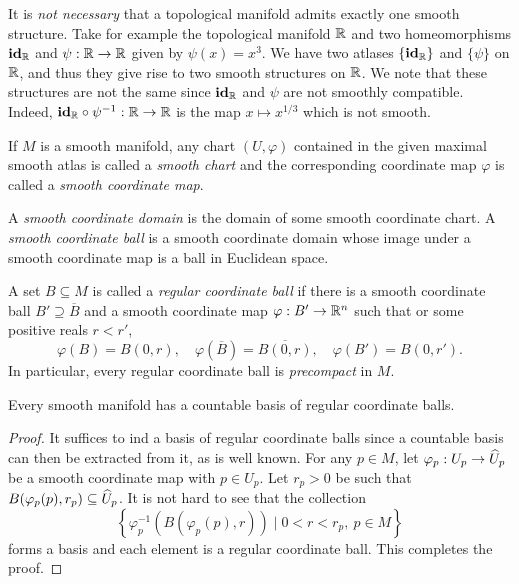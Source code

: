 \begin{remark}
    It is \emph{not necessary} that a topological manifold admits exactly one smooth structure. Take for example the topological manifold $\mathbb{R}$ and two homeomorphisms $\mathbf{id}_{\mathbb{R}}$ and $\psi:\mathbb{R}\to\mathbb{R}$ given by $\psi(x) = x^3$. We have two atlases $\{\mathbf{id}_{\mathbb{R}}\}$ and $\{\psi\}$ on $\mathbb{R}$, and thus they give rise to two smooth structures on $\mathbb{R}$. We note that these structures are not the same since $\mathbf{id}_{\mathbb{R}}$ and $\psi$ are not smoothly compatible. Indeed, $\mathbf{id}_{\mathbb{R}}\circ\psi^{-1}:\mathbb{R}\to\mathbb{R}$ is the map $x\mapsto x^{1/3}$ which is not smooth.
\end{remark}

\begin{definition}
    If $M$ is a smooth manifold, any chart $(U,\varphi)$ contained in the given maximal smooth atlas is called a \emph{smooth chart} and the corresponding coordinate map $\varphi$ is called a \emph{smooth coordinate map}. 
    
    A \emph{smooth coordinate domain} is the domain of some smooth coordinate chart. A \emph{smooth coordinate ball} is a smooth coordinate domain whose image under a smooth coordinate map is a ball in Euclidean space.

    A set $B\subseteq M$ is called a \emph{regular coordinate ball} if there is a smooth coordinate ball $B'\supseteq\overline B$ and a smooth coordinate map $\varphi: B'\to\mathbb{R}^n$ such that or some positive reals $r < r'$, 
    \begin{equation*}
        \varphi(B) = B(0,r),\quad\varphi(\overline B) = \overline{B(0,r)},\quad\varphi(B') = B(0, r').
    \end{equation*}
    In particular, every regular coordinate ball is \emph{precompact} in $M$.
\end{definition}

\begin{proposition}
    Every smooth manifold has a countable basis of regular coordinate balls.
\end{proposition}
\begin{proof}
    It suffices to ind a basis of regular coordinate balls since a countable basis can then be extracted from it, as is well known. For any $p\in M$, let $\varphi_p: U_p\to\widehat{U}_p$ be a smooth coordinate map with $p\in U_p$. Let $r_p > 0$ be such that $B(\varphi_p(p), r_p)\subseteq\widehat{U}_p$. It is not hard to see that the collection 
    \begin{equation*}
        \left\{\varphi_p^{-1}(B(\varphi_p(p), r))\mid 0 < r < r_p,~p\in M\right\}
    \end{equation*}
    forms a basis and each element is a regular coordinate ball. This completes the proof.
\end{proof}

